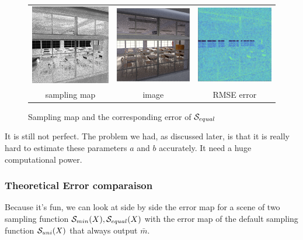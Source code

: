 \documentclass{classeENS}
\begin{document}
\begin{figure}[H]
    \centering
    \caption{Sampling map and the corresponding error of $\mathcal S_{equal}$}
    \begin{tabular}{ccc}
    \includegraphics[width=45mm]{image/without/sm.png}
    & \includegraphics[width=45mm]{image/without/normal.png}
    & \includegraphics[width=45mm]{image/without/RMSE_mean.png} \\
    sampling map & image & RMSE error
    \end{tabular}
\end{figure}

It is still not perfect. The problem we had, as discussed later, is that it 
is really hard to estimate these parameters $a$ and $b$ accurately. It need 
a huge computational power.

\subsubsection{Theoretical Error comparaison}

Because it's fun, we can look at side by side the error map for a scene of 
two sampling function $\mathcal S_{min}(X), \mathcal S_{equal}(X)$ with the error map
of the default sampling function $\mathcal S_{uni}(X)$ that always output $\bar m$.
\end{document}
